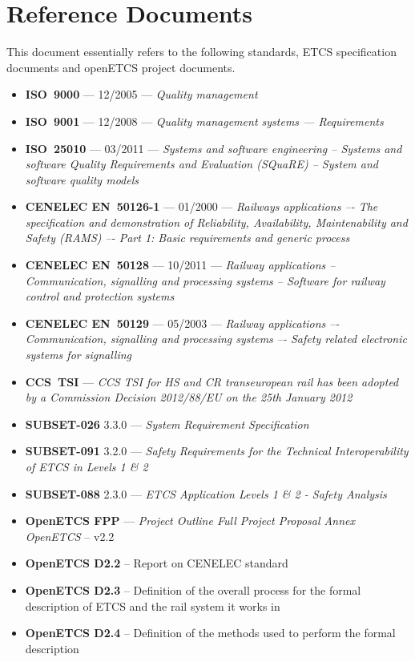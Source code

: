 \documentclass{template/openetcs_report}
\begin{document}
\section{Reference Documents}
\label{sec:refdoc}

This document essentially refers to the following standards, ETCS specification documents and openETCS project documents.

\begin{itemize}
\item \textbf{ISO~9000} --- 12/2005 --- \emph{Quality management}
\item \textbf{ISO~9001} --- 12/2008 --- \emph{Quality management systems — Requirements}
\item \textbf{ISO~25010} --- 03/2011 --- \emph{Systems and software engineering -- Systems and software Quality Requirements and Evaluation (SQuaRE) -- System and software quality models}
\item \textbf{CENELEC EN~50126-1} --- 01/2000 --- \emph{Railways applications –- The specification and 
demonstration of Reliability, Availability, Maintenability and Safety (RAMS) –- Part 1: 
Basic requirements and generic process}
\item \textbf{CENELEC EN~50128} --- 10/2011 --- \emph{Railway applications -- Communication, signalling and 
processing systems -- Software for railway control and protection systems}
\item \textbf{CENELEC EN~50129} --- 05/2003 --- \emph{Railway applications –- Communication, signalling and 
processing systems –- Safety related electronic systems for signalling}
\item \textbf{CCS~TSI} --- \emph{ CCS TSI for HS and CR transeuropean rail has been adopted by a Commission Decision 2012/88/EU on the 25th January 2012}
\item \textbf{SUBSET-026} 3.3.0 --- \emph{System Requirement Specification}
\item \textbf{SUBSET-091} 3.2.0 --- \emph{Safety Requirements for the Technical Interoperability
of ETCS in Levels 1 \& 2}
\item \textbf{SUBSET-088} 2.3.0 --- \emph{ETCS Application Levels 1 \& 2 - Safety Analysis}
\item \textbf{OpenETCS FPP} --- \emph{Project Outline Full Project Proposal Annex OpenETCS} -- v2.2
\item \textbf{OpenETCS D2.2} -- Report on CENELEC standard
\item \textbf{OpenETCS D2.3} -- Definition of the overall process for the formal description of ETCS and the rail system it works in 
\item \textbf{OpenETCS D2.4} -- Definition of the methods used to perform the formal description
\end{itemize}
\end{document}
